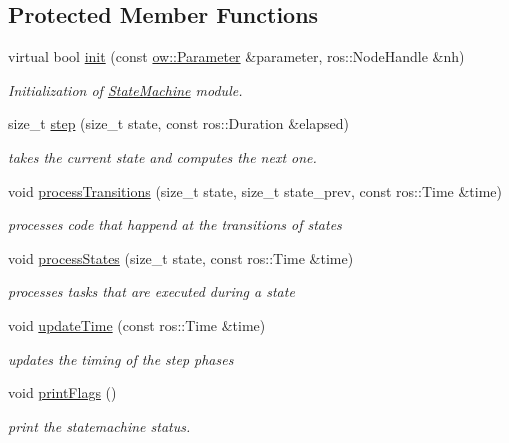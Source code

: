 \subsection*{Protected Member Functions}
\begin{DoxyCompactItemize}
\item 
virtual bool \hyperlink{classow__sm_1_1StateMachine_a5bc07d8178b35935cc963a7015a30318}{init} (const \hyperlink{classow_1_1Parameter}{ow\+::\+Parameter} \&parameter, ros\+::\+Node\+Handle \&nh)\hypertarget{classow__sm_1_1StateMachine_a5bc07d8178b35935cc963a7015a30318}{}\label{classow__sm_1_1StateMachine_a5bc07d8178b35935cc963a7015a30318}

\begin{DoxyCompactList}\small\item\em Initialization of \hyperlink{classow__sm_1_1StateMachine}{State\+Machine} module. \end{DoxyCompactList}\item 
size\+\_\+t \hyperlink{classow__sm_1_1StateMachine_afce26234a58017b9717cdaafb124066e}{step} (size\+\_\+t state, const ros\+::\+Duration \&elapsed)
\begin{DoxyCompactList}\small\item\em takes the current state and computes the next one. \end{DoxyCompactList}\item 
void \hyperlink{classow__sm_1_1StateMachine_a9c87da3cb1f98fb9f8923631b113bab2}{process\+Transitions} (size\+\_\+t state, size\+\_\+t state\+\_\+prev, const ros\+::\+Time \&time)
\begin{DoxyCompactList}\small\item\em processes code that happend at the transitions of states \end{DoxyCompactList}\item 
void \hyperlink{classow__sm_1_1StateMachine_a4d054388f3a4e4293ef09f681e675a18}{process\+States} (size\+\_\+t state, const ros\+::\+Time \&time)
\begin{DoxyCompactList}\small\item\em processes tasks that are executed during a state \end{DoxyCompactList}\item 
void \hyperlink{classow__sm_1_1StateMachine_a5353575902af2621c96418cc371ca867}{update\+Time} (const ros\+::\+Time \&time)
\begin{DoxyCompactList}\small\item\em updates the timing of the step phases \end{DoxyCompactList}\item 
void \hyperlink{classow__sm_1_1StateMachine_a7b2de8e2394c4051422dca148d2a1d38}{print\+Flags} ()
\begin{DoxyCompactList}\small\item\em print the statemachine status. \end{DoxyCompactList}\end{DoxyCompactItemize}
